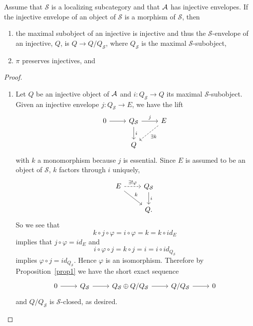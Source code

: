 \documentclass[dissertation.tex]{subfiles}
\begin{document}
\begin{cor}\label{cor2}
  Assume that $\mathcal{S}$ is a localizing subcategory and that $\mathcal{A}$ has injective envelopes.
  If the injective envelope of an object of $\mathcal{S}$ is a morphism of $\mathcal{S}$, then
  \begin{enumerate}
  \item\label{cor2.1}
    the maximal subobject of an injective is injective and thus the $\mathcal{S}$-envelope of an injective, $Q$, is $Q \rightarrow Q/Q_\mathcal{S}$, where $Q_\mathcal{S}$ is the maximal $\mathcal{S}$-subobject, 
  \item\label{cor2.2}
    $\pi$ preserves injectives, and
  \end{enumerate}
  \begin{proof}
    \begin{enumerate}
    \item
      Let $Q$ be an injective object of $\mathcal{A}$ and $i \colon Q_\mathcal{S} \rightarrow Q$ its maximal $\mathcal{S}$-subobject.
      Given an injective envelope $j \colon Q_\mathcal{S} \rightarrow E$, we have the lift
      $$\begin{tikzcd}
        0 \arrow{r} & Q_\mathcal{S} \arrow{d}{i} \arrow{r}{j} & E \arrow[dashed]{ld}{\exists k}\\
        & Q
      \end{tikzcd}$$
      with $k$ a monomorphism because $j$ is essential.
      Since $E$ is assumed to be an object of $\mathcal{S}$, $k$ factors through $i$ uniquely,
      $$\begin{tikzcd}
        E \arrow{rd}{k}\arrow[dashed]{r}{\exists !\varphi} & Q_\mathcal{S}\arrow{d}{i}\\
        & Q.
      \end{tikzcd}$$
      So we see that
      $$k \circ j \circ \varphi = i \circ \varphi = k = k \circ id_E$$
      implies that  $j \circ \varphi = id_E$
      and
      $$i \circ \varphi \circ j = k \circ j = i = i \circ id_{Q_\mathcal{S}}$$
      implies $\varphi \circ j = id_{Q_\mathcal{S}}$.
      Hence $\varphi$ is an isomorphism.
      Therefore by Proposition~\ref{prop1} we have the short exact sequence
      $$\begin{tikzcd}
        0 \arrow{r} & Q_\mathcal{S} \arrow{r} & Q_\mathcal{S} \oplus Q/Q_\mathcal{S} \arrow{r} & Q/Q_\mathcal{S} \arrow{r} & 0
      \end{tikzcd}$$
      and $Q/Q_\mathcal{S}$ is $\mathcal{S}$-closed, as desired.

\end{enumerate}
\end{proof}
\end{cor}
\end{document}
